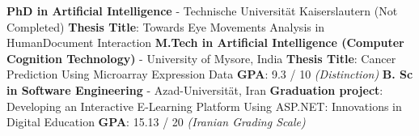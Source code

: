 %
%
%

\vspace{1em}

\begin{scholarship}
{
	\textbf{PhD in Artificial Intelligence} - Technische Universität Kaiserslautern (Not Completed)\newline
	\textbf{Thesis Title}: Towards Eye Movements Analysis in Human\-Document Interaction \newline
}
	{
		\textbf{M.Tech in Artificial Intelligence (Computer Cognition Technology)} - University of Mysore, India \newline
		\textbf{Thesis Title}: Cancer Prediction Using Microarray Expression Data \newline
		\textbf{GPA}: 9.3 / 10 \textit{(Distinction)
		 }\newline
	}
	{
		\textbf{B. Sc in Software Engineering} - Azad-Universität, Iran \newline
		\textbf{Graduation project}: Developing an Interactive E-Learning Platform Using ASP.NET: Innovations in Digital Education \newline
		\textbf{GPA}: 15.13 / 20 \textit{(Iranian Grading Scale)}  \newline
	}
\end{scholarship}
